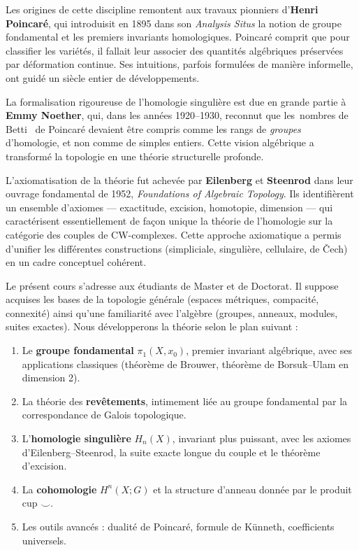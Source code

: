 \documentclass[12pt,a4paper,openany]{book}
\theoremstyle{definition}
\theoremstyle{plain}
\theoremstyle{remark}
\providecommand{\og}{\guillemotleft\,}
\providecommand{\fg}{\,\guillemotright}
\begin{document}
Les origines de cette discipline remontent aux travaux pionniers d'\textbf{Henri
Poincaré}, qui introduisit en 1895 dans son
\emph{Analysis Situs} la notion de groupe fondamental et les premiers invariants
homologiques. Poincaré comprit que pour classifier les variétés, il fallait leur
associer des quantités algébriques préservées par déformation continue. Ses
intuitions, parfois formulées de manière informelle, ont guidé un siècle entier
de développements.

La formalisation rigoureuse de l'homologie singulière est due en grande partie à
\textbf{Emmy Noether}, qui, dans les années 1920--1930,
reconnut que les \og nombres de Betti \fg{} de Poincaré devaient être compris
comme les rangs de \emph{groupes} d'homologie, et non comme de simples entiers.
Cette vision algébrique a transformé la topologie en une théorie structurelle
profonde.

L'axiomatisation de la théorie fut achevée par \textbf{Eilenberg} et
\textbf{Steenrod} dans leur
ouvrage fondamental de 1952, \emph{Foundations of Algebraic Topology}. Ils
identifièrent un ensemble d'axiomes --- exactitude, excision, homotopie,
dimension --- qui caractérisent essentiellement de façon unique la théorie de
l'homologie sur la catégorie des couples de CW-complexes. Cette approche
axiomatique a permis d'unifier les différentes constructions (simpliciale,
singulière, cellulaire, de \v{C}ech) en un cadre conceptuel cohérent.

Le présent cours s'adresse aux étudiants de Master et de Doctorat. Il suppose
acquises les bases de la topologie générale (espaces métriques, compacité,
connexité) ainsi qu'une familiarité avec l'algèbre (groupes, anneaux, modules,
suites exactes). Nous développerons la théorie selon le plan suivant :

\begin{enumerate}[label=\textbullet]
\item Le \textbf{groupe fondamental} $\pi_1(X, x_0)$,
premier invariant algébrique, avec ses applications classiques (théorème de
Brouwer, théorème de Borsuk--Ulam en dimension 2).
\item La théorie des \textbf{revêtements}, intimement liée au
groupe fondamental par la correspondance de Galois topologique.
\item L'\textbf{homologie singulière} $H_n(X)$,
invariant plus puissant, avec les axiomes d'Eilenberg--Steenrod, la suite exacte
longue du couple et le théorème d'excision.
\item La \textbf{cohomologie} $H^n(X; G)$ et la structure
d'anneau donnée par le produit cup $\smile$.
\item Les outils avancés : dualité de Poincaré, formule de
Künneth, coefficients universels.
\end{enumerate}
\end{document}
